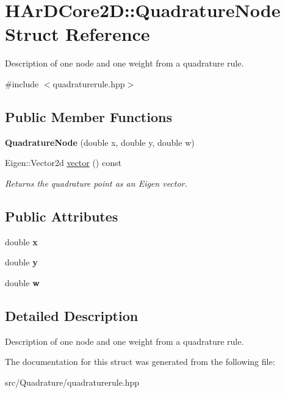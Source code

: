 \hypertarget{structHArDCore2D_1_1QuadratureNode}{}\section{H\+Ar\+D\+Core2D\+:\+:Quadrature\+Node Struct Reference}
\label{structHArDCore2D_1_1QuadratureNode}


Description of one node and one weight from a quadrature rule.  




{\ttfamily \#include $<$quadraturerule.\+hpp$>$}

\subsection*{Public Member Functions}
\begin{DoxyCompactItemize}
\item 
{\bfseries Quadrature\+Node} (double x, double y, double w)
\item 
Eigen\+::\+Vector2d \hyperlink{group__Quadratures_ga27f8f3696a0be686ed1606dda2425da6}{vector} () const
\begin{DoxyCompactList}\small\item\em Returns the quadrature point as an Eigen vector. \end{DoxyCompactList}\end{DoxyCompactItemize}
\subsection*{Public Attributes}
\begin{DoxyCompactItemize}
\item 
double {\bfseries x}
\item 
double {\bfseries y}
\item 
double {\bfseries w}
\end{DoxyCompactItemize}


\subsection{Detailed Description}
Description of one node and one weight from a quadrature rule. 

The documentation for this struct was generated from the following file\+:\begin{DoxyCompactItemize}
\item 
src/\+Quadrature/quadraturerule.\+hpp\end{DoxyCompactItemize}
